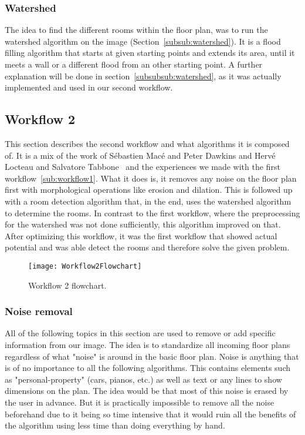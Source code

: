   
\subsubsection{Watershed}
The idea to find the different rooms within the floor plan, was to run the watershed algorithm on the image (Section~\ref{subsub:watershed}). It is a flood filling algorithm that starts at given starting points and extends its area, until it meets a wall or a different flood from an other starting point. A further explanation will be done in section~\ref{subsubsub:watershed}, as it was actually implemented and used in our second workflow.

\subsection{Workflow 2}
\label{sub:workflow2}
This section describes the second workflow and what algorithms it is composed of. It is a mix of the work of Sébastien Macé and Peter Dawkins and Hervé Locteau and Salvatore Tabbone~\citep{mace_valveny_loctea_tabbone_2010} and the experiences we made with the first workflow~\ref{sub:workflow1}. What it does is, it removes any noise on the floor plan first with morphological operations like erosion and dilation. This is followed up with a room detection algorithm that, in the end, uses the watershed algorithm to determine the rooms. In contrast to the first workflow, where the preprocessing for the watershed was not done sufficiently, this algorithm improved on that. After optimizing this workflow, it was the first workflow that showed actual potential and was able detect the rooms and therefore solve the given problem.


\begin{figure}[H]
	\centering
	\texttt{[image: Workflow2Flowchart]}
	\caption{Workflow 2 flowchart.}
	\label{fig:Workflow2Flowchart}
\end{figure}

\subsubsection{Noise removal}
All of the following topics in this section are used to remove or add specific information from our image. The idea is to standardize all incoming floor plans regardless of what "noise" is around in the basic floor plan. Noise is anything that is of no importance to all the following algorithms. This contains elements such as "personal-property" (cars, pianos, etc.) as well as text or any lines to show dimensions on the plan. The idea would be that most of this noise is erased by the user in advance. But it is practically impossible to remove all the noise beforehand due to it being so time intensive that it would ruin all the benefits of the algorithm using less time than doing everything by hand.

